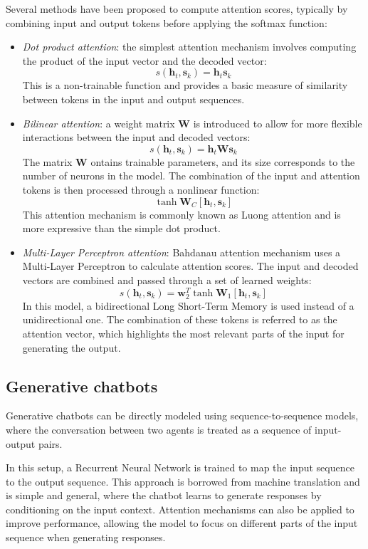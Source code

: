 Several methods have been proposed to compute attention scores, typically by combining input and output tokens before applying the softmax function:
\begin{itemize}
    \item \textit{Dot product attention}: the simplest attention mechanism involves computing the product of the input vector and the decoded vector:
        \[s(\mathbf{h}_t,\mathbf{s}_k)=\mathbf{h}_t\mathbf{s}_k\]
        This is a non-trainable function and provides a basic measure of similarity between tokens in the input and output sequences.
    \item \textit{Bilinear attention}: a weight matrix $\mathbf{W}$  is introduced to allow for more flexible interactions between the input and decoded vectors:
        \[s(\mathbf{h}_t,\mathbf{s}_k)=\mathbf{h}_t\mathbf{W}\mathbf{s}_k\]
        The matrix $\mathbf{W}$ ontains trainable parameters, and its size corresponds to the number of neurons in the model. 
        The combination of the input and attention tokens is then processed through a nonlinear function:
        \[\tanh{\mathbf{W}_C[\mathbf{h}_t,\mathbf{s}_k]}\]
        This attention mechanism is commonly known as Luong attention and is more expressive than the simple dot product.
    \item \textit{Multi-Layer Perceptron attention}: Bahdanau attention mechanism uses a Multi-Layer Perceptron to calculate attention scores. 
        The input and decoded vectors are combined and passed through a set of learned weights:
        \[s(\mathbf{h}_t,\mathbf{s}_k)=\mathbf{w}_2^T\tanh{\mathbf{W}_1[\mathbf{h}_t,\mathbf{s}_k]}\]
        In this model, a bidirectional Long Short-Term Memory is used instead of a unidirectional one. 
        The combination of these tokens is referred to as the attention vector, which highlights the most relevant parts of the input for generating the output.
\end{itemize}

\subsection{Generative chatbots}
Generative chatbots can be directly modeled using sequence-to-sequence models, where the conversation between two agents is treated as a sequence of input-output pairs. 

In this setup, a Recurrent Neural Network is trained to map the input sequence to the output sequence. 
This approach is borrowed from machine translation and is simple and general, where the chatbot  learns to generate responses by conditioning on the input context.
Attention mechanisms can also be applied to improve performance, allowing the model to focus on different parts of the input sequence when generating responses.

